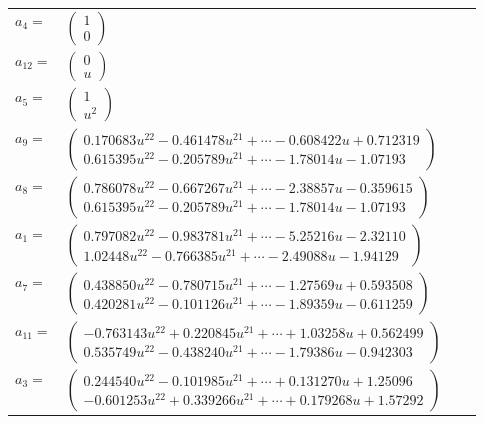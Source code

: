 \documentclass[1p]{elsarticle_modified}
\theoremstyle{definition}
\begin{document}
\begin{tabular}{m{7pt} m{180pt} m{7pt} m{180pt} }
\flushright $a_{4}=$&$\begin{pmatrix}1\\0\end{pmatrix}$ \\
\flushright $a_{12}=$&$\begin{pmatrix}0\\u\end{pmatrix}$ \\
\flushright $a_{5}=$&$\begin{pmatrix}1\\u^2\end{pmatrix}$ \\
\flushright $a_{9}=$&$\begin{pmatrix}0.170683 u^{22}-0.461478 u^{21}+\cdots-0.608422 u+0.712319\\0.615395 u^{22}-0.205789 u^{21}+\cdots-1.78014 u-1.07193\end{pmatrix}$ \\
\flushright $a_{8}=$&$\begin{pmatrix}0.786078 u^{22}-0.667267 u^{21}+\cdots-2.38857 u-0.359615\\0.615395 u^{22}-0.205789 u^{21}+\cdots-1.78014 u-1.07193\end{pmatrix}$ \\
\flushright $a_{1}=$&$\begin{pmatrix}0.797082 u^{22}-0.983781 u^{21}+\cdots-5.25216 u-2.32110\\1.02448 u^{22}-0.766385 u^{21}+\cdots-2.49088 u-1.94129\end{pmatrix}$ \\
\flushright $a_{7}=$&$\begin{pmatrix}0.438850 u^{22}-0.780715 u^{21}+\cdots-1.27569 u+0.593508\\0.420281 u^{22}-0.101126 u^{21}+\cdots-1.89359 u-0.611259\end{pmatrix}$ \\
\flushright $a_{11}=$&$\begin{pmatrix}-0.763143 u^{22}+0.220845 u^{21}+\cdots+1.03258 u+0.562499\\0.535749 u^{22}-0.438240 u^{21}+\cdots-1.79386 u-0.942303\end{pmatrix}$ \\
\flushright $a_{3}=$&$\begin{pmatrix}0.244540 u^{22}-0.101985 u^{21}+\cdots+0.131270 u+1.25096\\-0.601253 u^{22}+0.339266 u^{21}+\cdots+0.179268 u+1.57292\end{pmatrix}$ \\

\end{tabular}
\end{document}
